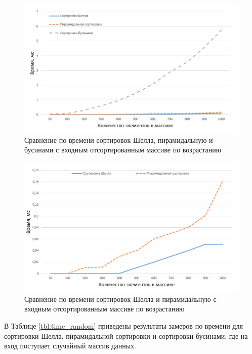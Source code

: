 \begin{figure}[h]
	\centering
	\includegraphics[height=0.3\textheight]{img/sort_1.png}
	\caption{Сравнение по времени сортировок Шелла, пирамидальную и бусинами с входным отсортированным массиве по возрастанию}
	\label{plt:sort_1}
\end{figure}

\clearpage

\begin{figure}[h]
	\centering
	\includegraphics[height=0.3\textheight]{img/sort_2.png}
	\caption{Сравнение по времени сортировок Шелла и пирамидальную с входным отсортированным массиве по возрастанию}
	\label{plt:sort_2}
\end{figure}

В Таблице \ref{tbl:time_random} приведены результаты замеров по времени для сортировки Шелла, пирамидальной сортировки и сортировки бусинами, где на вход поступает случайный массив данных.

